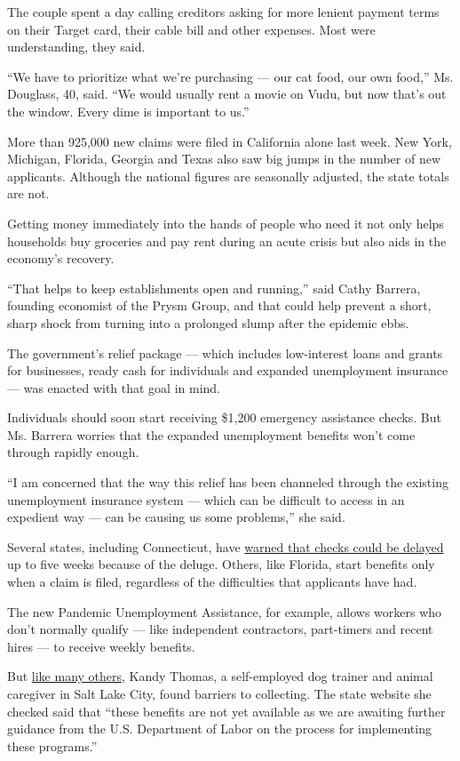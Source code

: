 The couple spent a day calling creditors asking for more lenient payment
terms on their Target card, their cable bill and other expenses. Most
were understanding, they said.

``We have to prioritize what we're purchasing --- our cat food, our own
food,'' Ms. Douglass, 40, said. ``We would usually rent a movie on Vudu,
but now that's out the window. Every dime is important to us.''

More than 925,000 new claims were filed in California alone last week.
New York, Michigan, Florida, Georgia and Texas also saw big jumps in the
number of new applicants. Although the national figures are seasonally
adjusted, the state totals are not.

Getting money immediately into the hands of people who need it not only
helps households buy groceries and pay rent during an acute crisis but
also aids in the economy's recovery.

``That helps to keep establishments open and running,'' said Cathy
Barrera, founding economist of the Prysm Group, and that could help
prevent a short, sharp shock from turning into a prolonged slump after
the epidemic ebbs.

The government's relief package --- which includes low-interest loans
and grants for businesses, ready cash for individuals and expanded
unemployment insurance --- was enacted with that goal in mind.

Individuals should soon start receiving \$1,200 emergency assistance
checks. But Ms. Barrera worries that the expanded unemployment benefits
won't come through rapidly enough.

``I am concerned that the way this relief has been channeled through the
existing unemployment insurance system --- which can be difficult to
access in an expedient way --- can be causing us some problems,'' she
said.

Several states, including Connecticut, have
\href{https://www.stamfordadvocate.com/business/article/CT-governor-cites-5-week-DOL-delay-for-15169776.php}{warned
that checks could be delayed} up to five weeks because of the deluge.
Others, like Florida, start benefits only when a claim is filed,
regardless of the difficulties that applicants have had.

The new Pandemic Unemployment Assistance, for example, allows workers
who don't normally qualify --- like independent contractors, part-timers
and recent hires --- to receive weekly benefits.

But
\href{https://www.nytimes3xbfgragh.onion/2020/04/08/business/economy/coronavirus-gig-unemployment.html}{like
many others}, Kandy Thomas, a self-employed dog trainer and animal
caregiver in Salt Lake City, found barriers to collecting. The state
website she checked said that ``these benefits are not yet available as
we are awaiting further guidance from the U.S. Department of Labor on
the process for implementing these programs.''

